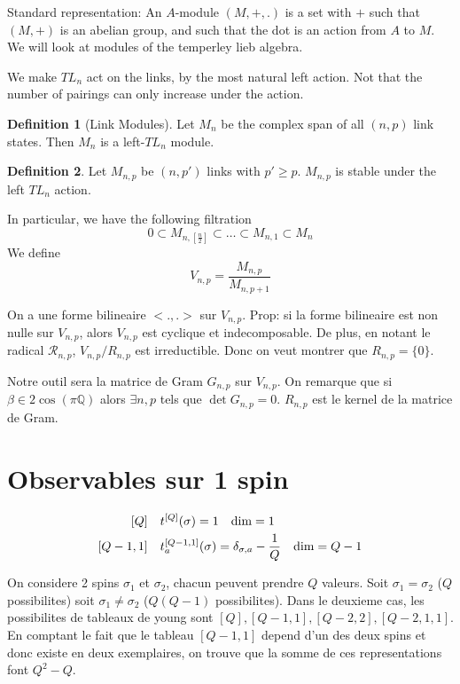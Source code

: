 \documentclass[a4paper]{book}
\theoremstyle{definition}
\newtheorem{definition}{Definition}[section]
\theoremstyle{remark}
\begin{document}
Standard representation: An $A$-module $(M,+,.)$ is a set with $+$ such that $(M,+)$ is an abelian group, and such that the dot is an action from $A$ to $M$. We will look at modules of the temperley lieb algebra. 

We make $TL_n$ act on the links, by the most natural left action. Not that the number of pairings can only increase under the action. 

\begin{definition}[Link Modules]
    Let $M_n$ be the complex span of all $(n,p)$ link states. Then $M_n$ is a left-$TL_n$ module. 
\end{definition}
\begin{definition}
    Let $M_{n,p}$ be $(n,p')$ links with $p'\geq p$. $M_{n,p}$ is stable under the left $TL_n$ action. 
\end{definition}
In particular, we have the following filtration 
\begin{equation}
    0 \subset M_{n, [\frac{n}{2}]} \subset \dots \subset M_{n,1} \subset M_n
\end{equation}
We define 
\begin{equation}
    V_{n,p} = \frac{M_{n,p}}{M_{n,p+1}}
\end{equation}

On a une forme bilineaire $<.,.>$ sur $V_{n,p}$. Prop: si la forme bilineaire est non nulle sur $V_{n,p}$, alors $V_{n,p}$ est cyclique et indecomposable. De plus, en notant le radical $\mathcal R_{n,p}$, $V_{n,p}/R_{n,p}$ est irreductible. Donc on veut montrer que $R_{n,p} = \{0\}$. \par \medskip 

Notre outil sera la matrice de Gram $G_{n,p}$ sur $V_{n,p}$. On remarque que si $\beta \in 2\cos (\pi \mathbb{Q})$ alors $\exists n,p$ tels que $\det G_{n,p} = 0$. $R_{n,p}$ est le kernel de la matrice de Gram. 

\section{Observables sur 1 spin}

\begin{equation}
    \begin{aligned}
        \relax [Q] &\quad t^{[Q]}(\sigma) = 1  \quad \text{dim} = 1\\ 
        [Q-1, 1] &\quad t_a^{[Q-1, 1]}(\sigma) = \delta_{\sigma, a} - \frac{1}{Q} \quad \text{dim} = Q-1 
    \end{aligned}
\end{equation}

On considere 2 spins $\sigma_1$ et $\sigma_2$, chacun peuvent prendre $Q$ valeurs. Soit $\sigma_1 = \sigma_2$ ($Q$ possibilites) soit $\sigma_1 \neq \sigma_2$ ($Q(Q-1)$ possibilites). Dans le deuxieme cas, les possibilites de tableaux de young sont $[Q], [Q-1, 1], [Q-2, 2], [Q-2, 1, 1]$. En comptant le fait que le tableau $[Q-1, 1]$ depend d'un des deux spins et donc existe en deux exemplaires, on trouve que la somme de ces representations font $Q^2 - Q$. 
\end{document}

